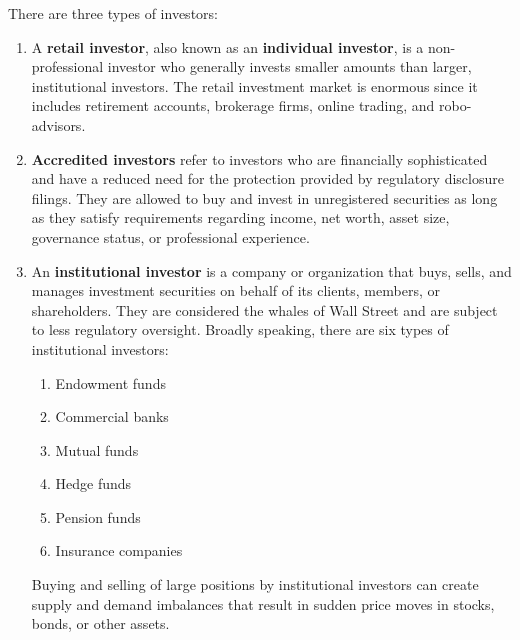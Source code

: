 \documentclass{article}
\begin{document}
  \begin{definition}
    There are three types of investors: 
    \begin{enumerate}
      \item A \textbf{retail investor}, also known as an \textbf{individual investor}, is a non-professional investor who generally invests smaller amounts than larger, institutional investors. The retail investment market is enormous since it includes retirement accounts, brokerage firms, online trading, and robo-advisors.
      \item \textbf{Accredited investors} refer to investors who are financially sophisticated and have a reduced need for the protection provided by regulatory disclosure filings. They are allowed to buy and invest in unregistered securities as long as they satisfy requirements regarding income, net worth, asset size, governance status, or professional experience. 
      \item An \textbf{institutional investor} is a company or organization that buys, sells, and manages investment securities on behalf of its clients, members, or shareholders. They are considered the whales of Wall Street and are subject to less regulatory oversight. Broadly speaking, there are six types of institutional investors: 
    \begin{enumerate}
      \item Endowment funds
      \item Commercial banks
      \item Mutual funds
      \item Hedge funds
      \item Pension funds
      \item Insurance companies
    \end{enumerate}
    Buying and selling of large positions by institutional investors can create supply and demand imbalances that result in sudden price moves in stocks, bonds, or other assets. 
    \end{enumerate}
  \end{definition}
\end{document}
